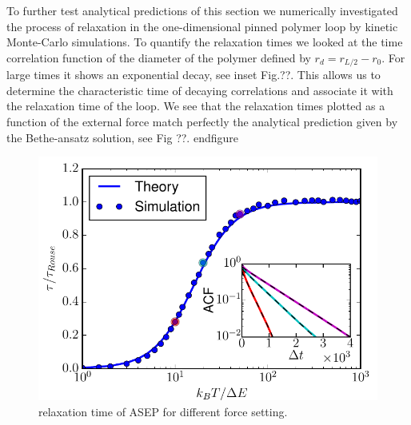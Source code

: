 \documentclass[aps,showpacs,twocolumn,floatfix,prx,superscriptaddress]{revtex4-1}
\begin{document}
To further test analytical predictions of this section we numerically investigated the process of relaxation in the one-dimensional pinned polymer loop by kinetic Monte-Carlo simulations. To quantify the relaxation times we looked at the time correlation function of the diameter of the polymer defined by $r_d = r_{L/2} - r_0$. For large times it shows an exponential decay, see inset Fig.??. This allows us to determine the characteristic time of decaying correlations and associate it with the relaxation time of the loop. We see that the relaxation times plotted as a function of the external force match perfectly the analytical prediction given by the Bethe-ansatz solution, see Fig ??.
end{figure}

\begin{figure}[htpb]
   \centering
   \includegraphics[width=1.0\linewidth]{relaxation1D}
   \caption{relaxation time of ASEP for different force setting.}
   \label{fig:relaxation1D}
\end{figure}



%
%
%
%
%
%
%
\end{document}
